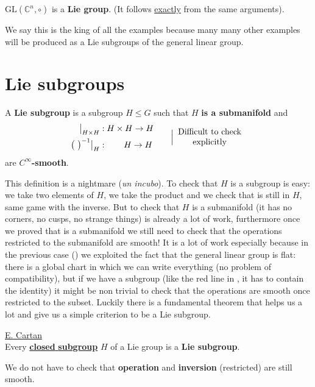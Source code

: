 \documentclass[../main.tex]{subfiles}
\begin{document}
\begin{example}
$\textrm{GL}(\mathbb{C}^n, \circ )$ is a \textbf{Lie group}. (It follows \underline{exactly} from the same arguments). 
\end{example}
We say this is the king of all the examples because many many other examples will be produced as a Lie subgroups of the general linear group.
\section{Lie subgroups}
\begin{definition}
A \textbf{Lie subgroup} is a subgroup $H\leq G$ such that $H$ \textbf{is a submanifold} and
\[
\begin{split}
    \big|_{H\times H}&: H\times H \to H\\
    \big(\ \big)^{-1}\big|_{H} &: \qquad H\to H
\end{split}
\qquad \Big| \text{\parbox{3 cm}{\centering Difficult to check explicitly}}
\]
are $C^\infty$\textbf{-smooth}.
\end{definition}
This definition is a nightmare (\textit{un incubo}). To check that $H$ is a subgroup is easy: we take two elements of $H$, we take the product and we check that is still in $H$, same game with the inverse. But to check that $H$ is a submanifold (it has no corners, no cusps, no strange things) is already a lot of work, furthermore once we proved that is a submanifold we still need to check that the operations restricted to the submanifold are smooth! It is a lot of work especially because in the previous case () we exploited the fact that the general linear group is flat: there is a global chart in which we can write everything (no problem of compatibility), but if we have a subgroup (like the red line in , it has to contain the identity) it might be non trivial to check that the operations are smooth once restricted to the subset. Luckily there is a fundamental theorem that helps us a lot and give us a simple criterion to be a Lie subgroup.
\begin{theorem} \underline{E. Cartan}\\
Every \underline{\textbf{closed} \textbf{subgroup}} $H$ of a Lie group is a \textbf{Lie subgroup}.
\end{theorem}
{\selectfont{}\relax} We do not have to check that \textbf{operation} and \textbf{inversion} (restricted) are still smooth.
\end{document}
